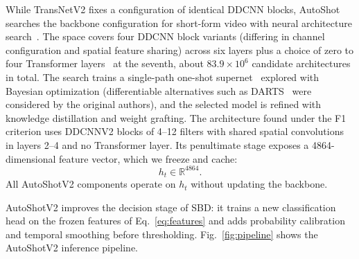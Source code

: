 While TransNetV2 fixes a configuration of identical DDCNN blocks, AutoShot
searches the backbone configuration for short-form video with neural
architecture search~\cite{zhu2023autoshot,elsken2019nas,white2023_nas1000,ren2020_nas_survey}.
The space covers four DDCNN block variants (differing in channel
configuration and spatial feature sharing) across six layers plus a choice
of zero to four Transformer layers~\cite{vaswani2017attention} at the
seventh, about $83.9\times10^6$ candidate architectures in total. The search
trains a single-path one-shot supernet~\cite{guo2020spos} explored with
Bayesian optimization (differentiable alternatives such as
DARTS~\cite{liu2019darts} were considered by the original authors), and the
selected model is refined with knowledge distillation and weight grafting.
The architecture found under the F1 criterion uses DDCNNV2 blocks of 4--12
filters with shared spatial convolutions in layers 2--4 and no Transformer
layer. Its penultimate stage exposes a 4864-dimensional feature vector,
which we freeze and cache:
\begin{equation}
    h_t \in \mathbb{R}^{4864}.
    \label{eq:features}
\end{equation}
All AutoShotV2 components operate on $h_t$ without updating the backbone.

AutoShotV2 improves the decision stage of SBD: it trains a new
classification head on the frozen features of Eq.~\eqref{eq:features} and
adds probability calibration and temporal smoothing before thresholding.
Fig.~\ref{fig:pipeline} shows the AutoShotV2 inference pipeline.

